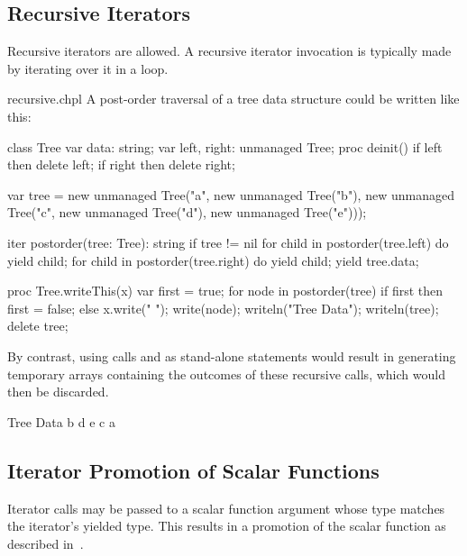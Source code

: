 \subsection{Recursive Iterators}
\label{Recursive_Iterators}

Recursive iterators are allowed. A recursive iterator invocation is
typically made by iterating over it in a loop.


\begin{chapelexample}{recursive.chpl}
A post-order traversal of a tree data structure could be written like this:
\begin{chapelnoprint}
class Tree {
  var data: string;
  var left, right: unmanaged Tree;
  proc deinit() {
    if left then delete left;
    if right then delete right;
  }
}

var tree = new unmanaged Tree("a", new unmanaged Tree("b"), new unmanaged Tree("c", new unmanaged Tree("d"), new unmanaged Tree("e")));
\end{chapelnoprint}
\begin{chapel}
iter postorder(tree: Tree): string {
  if tree != nil {
    for child in postorder(tree.left) do
      yield child;
    for child in postorder(tree.right) do
      yield child;
    yield tree.data;
  }
}
\end{chapel}
\begin{chapelnoprint}
proc Tree.writeThis(x)
{
  var first = true;
  for node in postorder(tree) {
    if first then first = false;
      else x.write(" ");
    write(node);
  }
}
writeln("Tree Data");
writeln(tree);
delete tree;
\end{chapelnoprint}
By contrast, using calls 
and  as stand-alone statements would
result in generating temporary arrays containing the outcomes of these
recursive calls, which would then be discarded.
\begin{chapeloutput}
Tree Data
b d e c a
\end{chapeloutput}
\end{chapelexample}

\subsection{Iterator Promotion of Scalar Functions}
\label{Iterator_Promotion_of_Scalar_Functions}

Iterator calls may be passed to a scalar function argument whose type
matches the iterator's yielded type.  This results in a promotion of the
scalar function as described in~.

